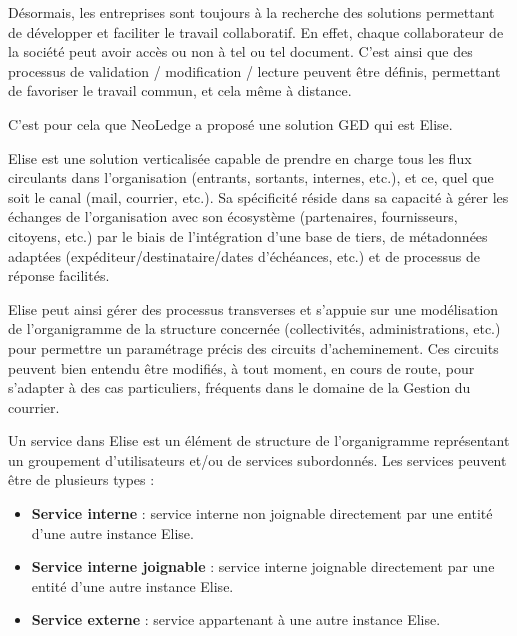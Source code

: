 Désormais, les entreprises sont toujours à la recherche des solutions permettant de développer et faciliter le travail collaboratif. En effet, chaque collaborateur de la société peut avoir accès ou non à tel ou tel document. C'est ainsi que des processus de validation / modification / lecture peuvent être définis, permettant de favoriser le travail commun, et cela même à distance.

C'est pour cela que NeoLedge a proposé une solution GED qui est Elise.




Elise est une solution verticalisée capable de prendre en charge tous les flux circulants dans l'organisation (entrants, sortants, internes, etc.), et ce, quel que soit le canal (mail, courrier, etc.). Sa  spécificité réside dans sa capacité à gérer les échanges de l'organisation avec son écosystème (partenaires, fournisseurs, citoyens, etc.) par le biais de l'intégration d'une base de tiers, de métadonnées adaptées (expéditeur/destinataire/dates d'échéances, etc.) et de processus de réponse facilités.

Elise peut ainsi gérer des processus transverses et s'appuie sur une modélisation de l'organigramme de la structure concernée (collectivités, administrations, etc.) pour permettre un paramétrage précis des circuits d'acheminement. Ces circuits peuvent bien entendu être modifiés, à tout moment, en cours de route, pour s'adapter à des cas particuliers, fréquents dans le domaine de la Gestion du courrier.

Un service dans Elise est un élément de structure de l'organigramme représentant un groupement d'utilisateurs et/ou de services subordonnés. Les services peuvent être de plusieurs types :

\begin{itemize}
\item \textbf{Service interne} : service interne non joignable directement par une entité d'une autre instance Elise.
\item \textbf{Service interne joignable} : service interne joignable directement par une entité d'une autre instance Elise.
\item \textbf{Service externe} : service appartenant à une autre instance Elise.
\end{itemize}

